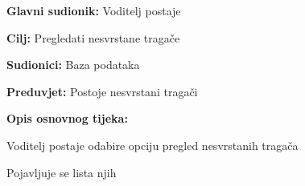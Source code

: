 					\noindent {}
					\begin{packed_item}
	
						\item \textbf{Glavni sudionik: }  Voditelj postaje
						\item  \textbf{Cilj:} Pregledati nesvrstane tragače
						\item  \textbf{Sudionici:} Baza podataka
						\item  \textbf{Preduvjet:} Postoje nesvrstani tragači
						\item  \textbf{Opis osnovnog tijeka:} 
						
						
						\item[] \begin{packed_enum}
	
							\item Voditelj postaje odabire opciju pregled nesvrstanih tragača						
							\item Pojavljuje se lista njih
							
						\end{packed_enum}
					\end{packed_item}
					\noindent {}
